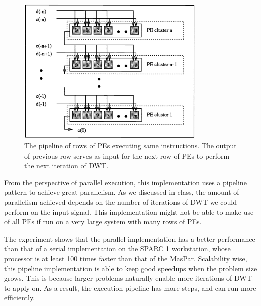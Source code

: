 \begin{figure}
    \centering
    \includegraphics[width=0.8\textwidth]{fig/simd2.png}
    \caption{The pipeline of rows of PEs executing same instructions.
             The output of previous row serves as input for the next row
             of PEs to perform the next iteration of DWT.}
    \label{fig:simd2}
\end{figure}


From the perspective of parallel execution, this implementation uses
a pipeline pattern to achieve great parallelism.
%
As we discussed in class, the amount of parallelism achieved depends on
the number of iterations of DWT we could perform on the input signal.
%
This implementation might not be able to make use of all PEs if run on 
a very large system with many rows of PEs.


The experiment shows that the parallel implementation has a better 
performance than that of a serial implementation on the SPARC 1 workstation,
whose processor is at least 100 times faster than that of the MasPar.
%
Scalability wise, this pipeline implementation is able to keep good speedups
when the problem size grows.
%
This is because larger problems naturally enable more iterations of DWT
to apply on.
%
As a result, the execution pipeline has more steps, and can run more efficiently.
